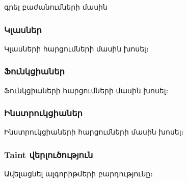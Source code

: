 {
    գրել բաժանումների մասին
    \subsubsection*{Կլասներ}
    Կլասների հարցումների մասին խոսել։

    \subsubsection*{Ֆունկցիաներ}
    Ֆունկցիաների հարցումների մասին խոսել։

    \subsubsection*{Ինստրուկցիաներ}
    Ինստրուկցիաների հարցումների մասին խոսել։

    \subsubsection*{Taint վերլուծություն}
    Ավելացնել ալգորիթմերի բարդությունը։
}